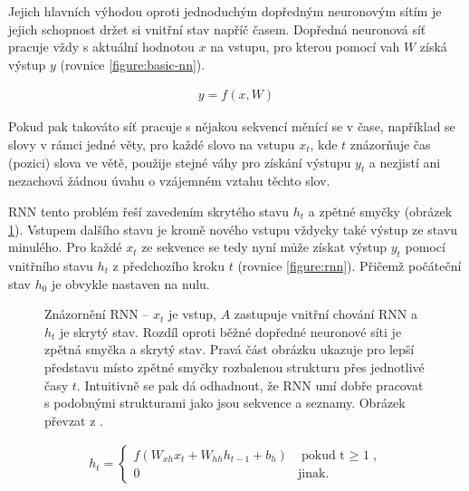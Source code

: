 Jejich hlavních výhodou oproti jednoduchým dopředným neuronovým sítím je jejich schopnost držet si vnitřní stav napříč časem. Dopředná neuronová síť pracuje vždy s aktuální hodnotou $x$ na vstupu, pro kterou pomocí vah $W$ získá výstup $y$ (rovnice \ref{figure:basic-nn}).

\begin{align}\label{figure:basic-nn}
  y = f (x, W)
\end{align}

Pokud pak takováto síť pracuje s nějakou sekvencí měnící se v čase, například se slovy v rámci jedné věty, pro každé slovo na vstupu $x_t$, kde $t$ znázorňuje čas (pozici) slova ve větě, použije stejné váhy pro získání výstupu $y_t$ a nezjistí ani nezachová žádnou úvahu o vzájemném vztahu těchto slov.

RNN tento problém řeší zavedením skrytého stavu $h_t$ a zpětné smyčky (obrázek \ref{img:rnn}). Vstupem dalšího stavu je kromě nového vstupu vždycky také výstup ze stavu minulého. Pro každé $x_t$ ze sekvence se tedy nyní může získat výstup $y_t$ pomocí vnitřního stavu $h_t$ z předchozího kroku $t$ (rovnice \ref{figure:rnn}). Přičemž počáteční stav  $h_0$ je obvykle nastaven na nulu.


\begin{figure}[h]
    \begin{center}
    \end{center}
	\caption{Znázornění RNN -- $x_t$ je vstup, $A$ zastupuje vnitřní chování RNN a $h_t$ je skrytý stav. Rozdíl oproti běžné dopředné neuronové síti je zpětná smyčka a skrytý stav. Pravá část obrázku ukazuje pro lepší představu místo zpětné smyčky rozbalenou strukturu přes jednotlivé časy $t$. Intuitivně se pak dá odhadnout, že RNN umí dobře pracovat s podobnými strukturami jako jsou sekvence a seznamy. Obrázek převzat z \cite{understandingLSTM}.}	
	\label{img:rnn}
\end{figure}

\begin{align}\label{figure:rnn}
  h_t = \begin{cases}
          f(W_{xh}x_t + W_{hh}h_{t-1} + b_h) & \mbox{pokud t $\geq$ 1}, \\
          0 & \mbox{jinak}.
        \end{cases}
\end{align}


